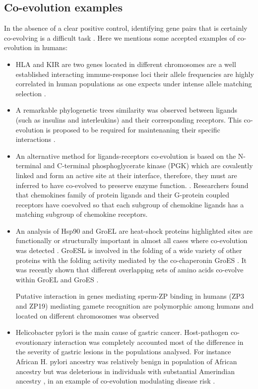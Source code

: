 \subsection{Co-evolution examples}

In the absence of a clear positive control, identifying gene pairs that is certainly co-evolving is a difficult task \cite{rohlfs2010detecting}.
Here we mentions some accepted examples of co-evolution in humans:

\begin{itemize}

\item HLA and KIR are two genes located in different chromosomes are a well established interacting immune-response loci their allele frequencies are highly correlated in human populations as one expects under intense allele matching selection \cite{rohlfs2010detecting:REF}.

\item A remarkable phylogenetic trees similarity was observed between ligands (such as insulins and interleukins) and their corresponding receptors.
This co‐evolution is proposed to be required for maintenaning their specific interactions \cite{de2013emerging:REF}.

\item An alternative method for ligands-receptors co-evolution is based on the N-terminal and C-terminal phosphoglycerate kinase (PGK) which are covalently linked and form an active site at their interface, therefore, they must are inferred to have co-evolved to preserve enzyme function. \cite{goh2000co}.
Researchers found that chemokines family of protein ligands and their G-protein coupled receptors have coevolved so that each subgroup of chemokine ligands has a matching subgroup of chemokine receptors. \cite{goh2000co}

\item An analysis of Hsp90 and GroEL are heat-shock proteins highlighted sites are functionally or structurally important in almost all cases where co-evolution was detected \cite{fares2006novel}.
GroESL is involved in the folding of a wide variety of other proteins with the folding activity mediated by the co-chaperonin GroES  \cite{ruiz2013coevolution}.
It was recently shown that different overlapping sets of amino acids co-evolve within GroEL and GroES \cite{ruiz2013coevolution}.

\tiem Putative interaction in genes mediating sperm-ZP binding in humans (ZP3 and ZP19) mediating gamete recognition are polymorphic among humans and located on different chromosomes was observed \cite{rohlfs2010detecting}

\item Helicobacter pylori is the main cause of gastric cancer. Host-pathogen co-evoutionary interaction was completely accounted most of the difference in the severity of gastric lesions in the populations analysed. For instance African H. pylori ancestry was relatively benign in population of African ancestry but was deleterious in individuals with substantial Amerindian ancestry \cite{kodaman2014human}, in an example of co-evolution modulating disease risk \cite{kodaman2014human}.

\end{itemize}

